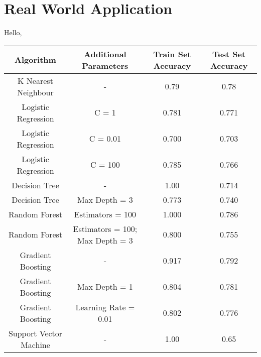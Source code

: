 \documentclass[12pt]{article}
\begin{document}
\part{Real World Application}
Hello,
{%
    \clearpage%
    \thispagestyle{empty}%
    \begin{landscape}%
        \centering %
\begin{table}[]
\begin{tabular}{|c|c|c|c|}
\hline
Algorithm              & Additional Parameters                              & Train Set Accuracy & Test Set Accuracy \\ \hline
K Nearest Neighbour    & -                                                  & 0.79               & 0.78              \\ \hline
Logistic Regression    & C = 1                                              & 0.781              & 0.771             \\ \hline
Logistic Regression    & C = 0.01                                           & 0.700              & 0.703             \\ \hline
Logistic Regression    & C = 100                                            & 0.785              & 0.766             \\ \hline
Decision Tree          & -                                                  & 1.00               & 0.714             \\ \hline
Decision Tree          & Max Depth = 3                                      & 0.773              & 0.740             \\ \hline
Random Forest          & Estimators = 100                                   & 1.000              & 0.786             \\ \hline
Random Forest          & Estimators = 100; Max Depth = 3                    & 0.800              & 0.755             \\ \hline
Gradient Boosting      & -                                                  & 0.917              & 0.792             \\ \hline
Gradient Boosting      & Max Depth = 1                                      & 0.804              & 0.781             \\ \hline
Gradient Boosting      & Learning Rate = 0.01                               & 0.802              & 0.776             \\ \hline
Support Vector Machine & -                                                  & 1.00               & 0.65              \\ \hline

\end{tabular}
\end{table}
\end{landscape}}
\end{document}
